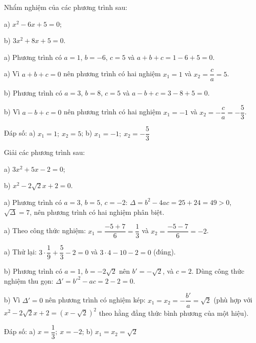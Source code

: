 \begin{problem}[9DS-PT2-033]
Nhẩm nghiệm của các phương trình sau:

a) $x^2 - 6x + 5 = 0$;

b) $3x^2 + 8x + 5 = 0$.

\begin{solution}
a) Phương trình có $a = 1$, $b = -6$, $c = 5$ và $a + b + c = 1 - 6 + 5 = 0$.

a) Vì $a + b + c = 0$ nên phương trình có hai nghiệm $x_1 = 1$ và $x_2 = \dfrac{c}{a} = 5$.

b) Phương trình có $a = 3$, $b = 8$, $c = 5$ và $a - b + c = 3 - 8 + 5 = 0$.

b) Vì $a - b + c = 0$ nên phương trình có hai nghiệm $x_1 = -1$ và $x_2 = -\dfrac{c}{a} = -\dfrac{5}{3}$.

Đáp số: a) $\boxed{x_1 = 1;\ x_2 = 5}$; b) $\boxed{x_1 = -1;\ x_2 = -\dfrac{5}{3}}$
\end{solution}
\end{problem}

\begin{problem}[9DS-PT2-034]
Giải các phương trình sau:

a) $3x^2 + 5x - 2 = 0$;

b) $x^2 - 2\sqrt{2}x + 2 = 0$.

\begin{solution}
a) Phương trình có $a = 3$, $b = 5$, $c = -2$: $\Delta = b^2 - 4ac = 25 + 24 = 49 > 0$, $\sqrt{\Delta} = 7$, nên phương trình có hai nghiệm phân biệt.

a) Theo công thức nghiệm: $x_1 = \dfrac{-5 + 7}{6} = \dfrac{1}{3}$ và $x_2 = \dfrac{-5 - 7}{6} = -2$.

a) Thử lại: $3 \cdot \dfrac{1}{9} + \dfrac{5}{3} - 2 = 0$ và $3 \cdot 4 - 10 - 2 = 0$ (đúng).

b) Phương trình có $a = 1$, $b = -2\sqrt{2}$ nên $b' = -\sqrt{2}$, và $c = 2$. Dùng công thức nghiệm thu gọn: $\Delta' = b'^2 - ac = 2 - 2 = 0$.

b) Vì $\Delta' = 0$ nên phương trình có nghiệm kép: $x_1 = x_2 = -\dfrac{b'}{a} = \sqrt{2}$ (phù hợp với $x^2 - 2\sqrt{2}x + 2 = (x - \sqrt{2})^2$ theo hằng đẳng thức bình phương của một hiệu).

Đáp số: a) $\boxed{x = \dfrac{1}{3};\ x = -2}$; b) $\boxed{x_1 = x_2 = \sqrt{2}}$
\end{solution}
\end{problem}

